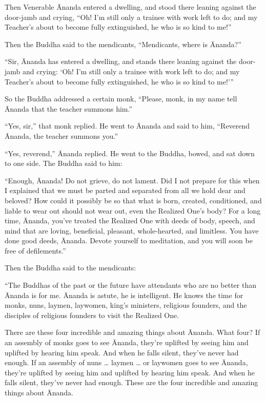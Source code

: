 \documentclass[12pt,openany]{book}%
\begin{document}
Then Venerable Ānanda entered a dwelling, and stood there leaning against the door-jamb and crying, “Oh! I’m still only a trainee with work left to do; and my Teacher’s about to become fully extinguished, he who is so kind to me!” 

Then the Buddha said to the mendicants, “Mendicants, where is Ānanda?” 

“Sir, Ānanda has entered a dwelling, and stands there leaning against the door-jamb and crying: ‘Oh! I’m still only a trainee with work left to do; and my Teacher’s about to become fully extinguished, he who is so kind to me!’” 

So the Buddha addressed a certain monk, “Please, monk, in my name tell Ānanda that the teacher summons him.” 

“Yes, sir,” that monk replied. He went to Ānanda and said to him, “Reverend Ānanda, the teacher summons you.” 

“Yes, reverend,” Ānanda replied. He went to the Buddha, bowed, and sat down to one side. The Buddha said to him: 

“Enough, Ānanda! Do not grieve, do not lament. Did I not prepare for this when I explained that we must be parted and separated from all we hold dear and beloved? How could it possibly be so that what is born, created, conditioned, and liable to wear out should not wear out, even the Realized One’s body? For a long time, Ānanda, you’ve treated the Realized One with deeds of body, speech, and mind that are loving, beneficial, pleasant, whole-hearted, and limitless. You have done good deeds, Ānanda. Devote yourself to meditation, and you will soon be free of defilements.” 

Then the Buddha said to the mendicants: 

“The Buddhas of the past or the future have attendants who are no better than Ānanda is for me. Ānanda is astute, he is intelligent. He knows the time for monks, nuns, laymen, laywomen, king’s ministers, religious founders, and the disciples of religious founders to visit the Realized One. 

There are these four incredible and amazing things about Ānanda. What four? If an assembly of monks goes to see Ānanda, they’re uplifted by seeing him and uplifted by hearing him speak. And when he falls silent, they’ve never had enough. If an assembly of nuns … laymen … or laywomen goes to see Ānanda, they’re uplifted by seeing him and uplifted by hearing him speak. And when he falls silent, they’ve never had enough. These are the four incredible and amazing things about Ānanda. 
\end{document}
